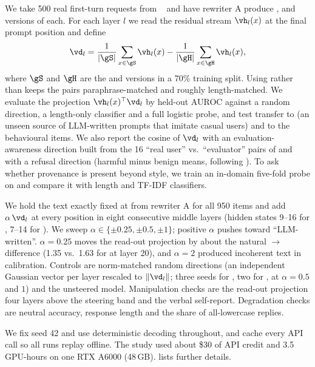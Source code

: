 We take 500 real first-turn requests from \wildchat~\citep{zhao2024wildchat} and have rewriter A produce \vH, \vL and \vS versions of each.
For each layer $l$ we read the residual stream $\vh_l(x)$ at the final prompt position and define
\begin{equation}
    \vd_l = \frac{1}{|\gS|}\sum_{x\in\gS}\vh_l(x) - \frac{1}{|\gH|}\sum_{x\in\gH}\vh_l(x),
    \label{eq:dir}
\end{equation}
where $\gS$ and $\gH$ are the \vS and \vH versions in a 70\% training split.
Using \vS rather than \vL keeps the pairs paraphrase-matched and roughly length-matched.
We evaluate the projection $\vh_l(x)^\top\vd_l$ by held-out AUROC against a random direction, a length-only classifier and a full logistic probe, and test transfer to \polistance (an unseen source of LLM-written prompts that imitate casual users) and to the behavioural items.
We also report the cosine of $\vd_l$ with an evaluation-awareness direction built from the 16 ``real user'' vs.\ ``evaluator'' pairs of \citet{hua2025steering} and with a refusal direction (\jbb harmful minus benign means, following \citealt{arditi2024refusal}).
To ask whether provenance is present beyond style, we train an in-domain five-fold probe on \polistance and compare it with length and TF-IDF classifiers.

We hold the text exactly fixed at \vH from rewriter A for all 950 items and add $\alpha\,\vd_l$ at every position in eight consecutive middle layers (hidden states 9--16 for \llama, 7--14 for \qwen).
We sweep $\alpha \in \{\pm 0.25, \pm 0.5, \pm 1\}$; positive $\alpha$ pushes toward ``LLM-written''.
$\alpha=0.25$ moves the read-out projection by about the natural \vH$\to$\vS difference (1.35 vs.\ 1.63 for \llama at layer 20), and $\alpha=2$ produced incoherent text in calibration.
Controls are norm-matched random directions (an independent Gaussian vector per layer rescaled to $\|\vd_l\|$; three seeds for \llama, two for \qwen, at $\alpha=0.5$ and $1$) and the unsteered model.
Manipulation checks are the read-out projection four layers above the steering band and the verbal self-report.
Degradation checks are neutral \triviaqa accuracy, response length and the share of all-lowercase replies.

We fix seed 42 and use deterministic decoding throughout, and cache every API call so all runs replay offline.
The study used about \$30 of API credit and 3.5 GPU-hours on one RTX A6000 (48\,GB).
 lists further details.
